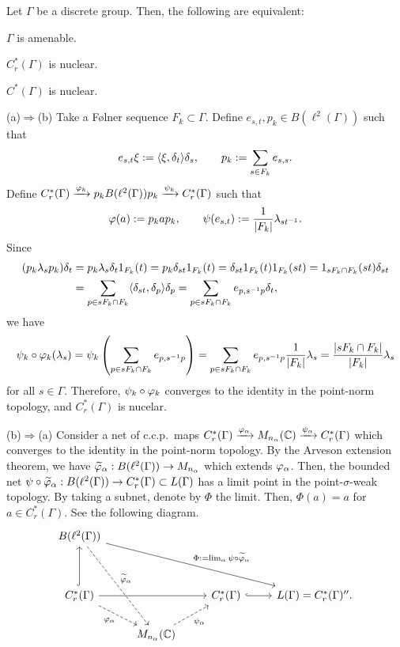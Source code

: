\documentclass{../../../small}
\begin{document}
\begin{thm}[Nuclearity]
Let $\Gamma$ be a discrete group.
Then, the following are equivalent:
\begin{parts}
\item $\Gamma$ is amenable.
\item $C_r^*(\Gamma)$ is nuclear.
\item $C^*(\Gamma)$ is nuclear.
\end{parts}
\end{thm}
\begin{pf}
(a)$\Rightarrow$(b)
Take a F\o lner sequence $F_k\subset\Gamma$.
Define $e_{s,t},p_k\in B(\ell^2(\Gamma))$ such that
\[e_{s,t}\xi:=\langle\xi,\delta_t\rangle\delta_s,\qquad p_k:=\sum_{s\in F_k}e_{s,s}.\]
Define $C_r^*(\Gamma)\xrightarrow{\varphi_k}p_kB(\ell^2(\Gamma))p_k\xrightarrow{\psi_k}C_r^*(\Gamma)$ such that
\[\varphi(a):=p_kap_k,\qquad\psi(e_{s,t}):=\frac1{|F_k|}\lambda_{st^{-1}}.\]
Since
\begin{align*}
(p_k\lambda_sp_k)\delta_t
&=p_k\lambda_s\delta_t1_{F_k}(t)
=p_k\delta_{st}1_{F_k}(t)
=\delta_{st}1_{F_k}(t)1_{F_k}(st)
=1_{sF_k\cap F_k}(st)\delta_{st}\\
&=\sum_{p\in sF_k\cap F_k}\langle\delta_{st},\delta_p\rangle\delta_p
=\sum_{p\in sF_k\cap F_k}e_{p,s^{-1}p}\delta_t,
\end{align*}
we have
\[\psi_k\circ\varphi_k(\lambda_s)=\psi_k\left(\sum_{p\in sF_k\cap F_k}e_{p,s^{-1}p}\right)=\sum_{p\in sF_k\cap F_k}e_{p,s^{-1}p}\frac1{|F_k|}\lambda_s=\frac{|sF_k\cap F_k|}{|F_k|}\lambda_s\]
for all $s\in\Gamma$.
Therefore, $\psi_k\circ\varphi_k$ converges to the identity in the point-norm topology, and $C_r^*(\Gamma)$ is nucelar.

(b)$\Rightarrow$(a)
Consider a net of c.c.p.~maps $C_r^*(\Gamma)\xrightarrow{\varphi_\alpha}M_{n_\alpha}(\mathbb{C})\xrightarrow{\psi_\alpha}C_r^*(\Gamma)$ which converges to the identity in the point-norm topology.
By the Arveson extension theorem, we have $\widetilde{\varphi}_\alpha:B(\ell^2(\Gamma))\to M_{n_\alpha}$ which extends $\varphi_\alpha$.
Then, the bounded net $\psi\circ\widetilde{\varphi}_\alpha:B(\ell^2(\Gamma))\to C_r^*(\Gamma)\subset L(\Gamma)$ has a limit point in the point-$\sigma$-weak topology.
By taking a subnet, denote by $\Phi$ the limit.
Then, $\Phi(a)=a$ for $a\in C_r^*(\Gamma)$.
See the following diagram.
\[\begin{tikzcd}
B(\ell^2(\Gamma)) \ar[dashed]{rddd}{\tilde\f_\alpha}\ar{rrrdd}{\Phi:=\lim_\alpha\psi\circ\tilde\f_\alpha}&&&\\
&&&\\
C_r^*(\Gamma)\ar{rr}\ar[swap,dashed]{rd}{\f_\alpha}\ar[hook]{uu}&&C_r^*(\Gamma)\ar[hook]{r}&L(\Gamma)=C_r^*(\Gamma)''.\\
&M_{n_\alpha}(\C)\ar[swap,dashed]{ur}{\psi_\alpha}&&
\end{tikzcd}\]


\end{pf}
\end{document}
